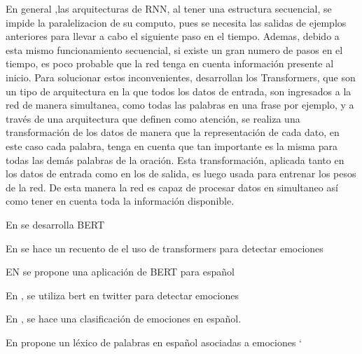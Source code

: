 En general ,las arquitecturas de RNN, al tener una estructura secuencial, se impide la paralelizacion de su computo, pues se necesita las salidas de ejemplos anteriores para llevar a cabo el siguiente paso en el tiempo. Ademas, debido a esta mismo funcionamiento secuencial, si existe un gran numero de pasos en el tiempo, es poco probable que la red tenga en cuenta información presente al inicio. Para solucionar estos inconvenientes, \cite{vaswani2017attention} desarrollan los Transformers, que son un tipo de arquitectura en la que todos los datos de entrada, son ingresados a la red de manera simultanea, como todas las palabras en una frase por ejemplo, y a través de una arquitectura que definen como atención, se realiza una transformación de los datos de manera que la representación de cada dato, en este caso cada palabra, tenga en cuenta que tan importante es la misma para todas las demás palabras de la oración. Esta transformación, aplicada tanto en los datos de entrada como en los de salida, es luego usada para entrenar los pesos de la red. De esta manera la red es capaz de procesar datos en simultaneo así como tener en cuenta toda la información disponible.
 

En \cite{devlin2018bert} se desarrolla BERT

En \cite{acheampong2021transformer} se hace un recuento de el uso de transformers para detectar emociones

EN \cite{canete2020spanish} se propone una aplicación de BERT para español

En \cite{gonzalez2021twilbert}, \cite{huang2019ana} se utiliza bert en twitter para  detectar emociones

En \cite{plaza2020improved}, \cite{gil2013combining} se hace una clasificación de emociones en español.


En \cite{sidorov2012empirical} propone un léxico de palabras en español asociadas a emociones
`








